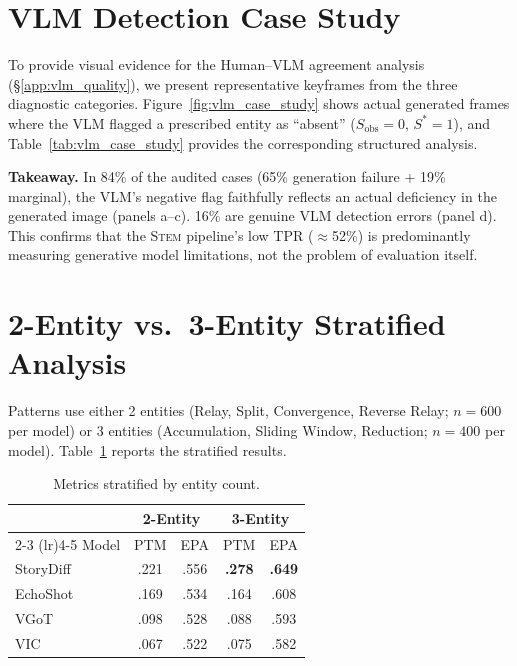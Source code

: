 \documentclass[sigconf,review,anonymous]{acmart}
\newcommand{\stem}{\textsc{Stem}}
\begin{document}
\section{VLM Detection Case Study}
\label{app:vlm_cases}

To provide visual evidence for the Human--VLM agreement analysis (\S\ref{app:vlm_quality}), we present representative keyframes from the three diagnostic categories. Figure~\ref{fig:vlm_case_study} shows actual generated frames where the VLM flagged a prescribed entity as ``absent'' ($S_\text{obs} = 0$, $S^* = 1$), and Table~\ref{tab:vlm_case_study} provides the corresponding structured analysis.

\noindent\textbf{Takeaway.} In 84\% of the audited cases (65\% generation failure + 19\% marginal), the VLM's negative flag faithfully reflects an actual deficiency in the generated image (panels a--c). 16\% are genuine VLM detection errors (panel d). This confirms that the \stem{} pipeline's low TPR ($\approx$52\%) is predominantly measuring generative model limitations, not the problem of evaluation itself.


\section{2-Entity vs.\ 3-Entity Stratified Analysis}
\label{app:entity_count}

Patterns use either 2 entities (Relay, Split, Convergence, Reverse Relay; $n = 600$ per model) or 3 entities (Accumulation, Sliding Window, Reduction; $n = 400$ per model). Table~\ref{tab:entity_strat} reports the stratified results.
\begin{table}[H]
\caption{Metrics stratified by entity count.}
\label{tab:entity_strat}
\centering
\small
\setlength{\tabcolsep}{3pt}
\begin{tabular}{@{}l cccc@{}}
\toprule
& \multicolumn{2}{c}{2-Entity} & \multicolumn{2}{c}{3-Entity} \\
\cmidrule(lr){2-3} \cmidrule(lr){4-5}
Model & PTM & EPA & PTM & EPA \\
\midrule
StoryDiff    & .221 & .556 & \textbf{.278} & \textbf{.649} \\
EchoShot  & .169 & .534 & .164 & .608 \\
VGoT  & .098 & .528 & .088 & .593 \\
VIC   & .067 & .522 & .075 & .582 \\
\bottomrule
\end{tabular}
\end{table}
\end{document}
